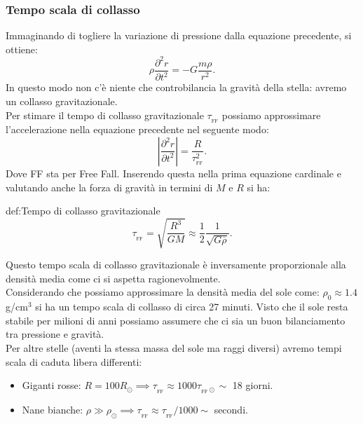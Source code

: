 \subsubsection{Tempo scala di collasso}
\label{subsubsec:Tempo scala di collasso}
Immaginando di togliere la variazione di pressione dalla equazione precedente, si ottiene:
\[
	\rho\frac{\partial^2r}{\partial t^2} 
	=
	-G \frac{m\rho}{r^2}
.\] 
In questo modo non c'è niente che controbilancia la gravità della stella: avremo un collasso gravitazionale.\\
Per stimare il tempo di collasso gravitazionale $\tau_{_\text{FF}}$ possiamo approssimare l'accelerazione nella equazione precedente nel seguente modo:
\[
	\left| \frac{\partial ^2 r}{\partial t^2}  \right| = \frac{R}{\tau_{_\text{FF}}^2}
.\] 
Dove FF sta per Free Fall. Inserendo questa nella prima equazione cardinale e valutando anche la forza di gravità in termini di $M$ e $R$ si ha:
\begin{defn}{def:Tempo di collasso gravitazionale}
	\[
		\tau_{_\text{FF}} = \sqrt{\frac{R^3}{GM}} \approx \frac{1}{2} \frac{1}{\sqrt{G\overline{\rho}} }
	.\] 
\end{defn}
Questo tempo scala di collasso gravitazionale è inversamente proporzionale alla densità media come ci si aspetta ragionevolmente.\\
Considerando che possiamo approssimare la densità media del sole come: $\rho_0 \approx 1.4$ g/cm$^3$ si ha un tempo scala di collasso di circa 27 minuti. Visto che il sole resta stabile per milioni di anni possiamo assumere che ci sia un buon bilanciamento tra pressione e gravità.\\
Per altre stelle (aventi la stessa massa del sole ma raggi diversi) avremo tempi scala di caduta libera differenti:
\begin{itemize}
	\item Giganti rosse: $R = 100R_{\odot} \implies \tau_{_\text{FF}} \approx 1000 \tau_{_\text{FF}\odot} \sim $ 18 giorni.
	\item Nane bianche: $\rho  \gg \rho_{\odot} \implies \tau_{_\text{FF}} \approx \tau_{_\text{FF}}/1000 \sim $ secondi.
\end{itemize}

